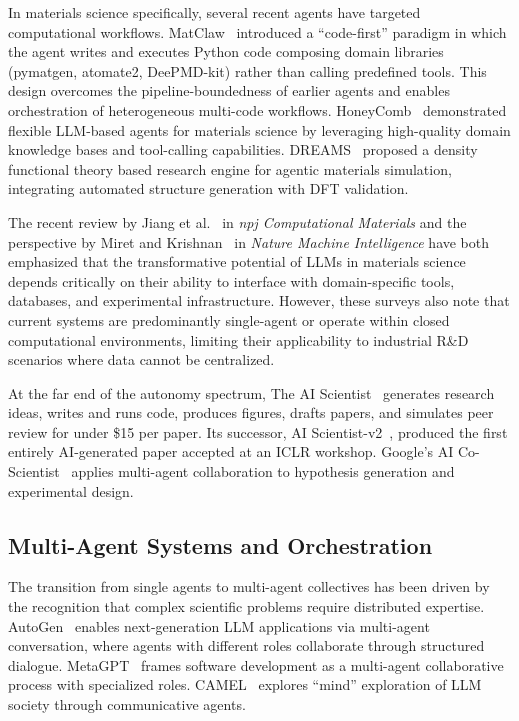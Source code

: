 \documentclass{article}
\begin{document}
In materials science specifically, several recent agents have targeted computational workflows. MatClaw~\cite{liu2024matclaw} introduced a ``code-first'' paradigm in which the agent writes and executes Python code composing domain libraries (pymatgen, atomate2, DeePMD-kit) rather than calling predefined tools. This design overcomes the pipeline-boundedness of earlier agents and enables orchestration of heterogeneous multi-code workflows. HoneyComb~\cite{zhang2024honeycomb} demonstrated flexible LLM-based agents for materials science by leveraging high-quality domain knowledge bases and tool-calling capabilities. DREAMS~\cite{wang2025dreams} proposed a density functional theory based research engine for agentic materials simulation, integrating automated structure generation with DFT validation.

The recent review by Jiang et al.~\cite{jiang2025npj} in \textit{npj Computational Materials} and the perspective by Miret and Krishnan~\cite{miret2025nmi} in \textit{Nature Machine Intelligence} have both emphasized that the transformative potential of LLMs in materials science depends critically on their ability to interface with domain-specific tools, databases, and experimental infrastructure. However, these surveys also note that current systems are predominantly single-agent or operate within closed computational environments, limiting their applicability to industrial R\&D scenarios where data cannot be centralized.

At the far end of the autonomy spectrum, The AI Scientist~\cite{lu2024} generates research ideas, writes and runs code, produces figures, drafts papers, and simulates peer review for under \$15 per paper. Its successor, AI Scientist-v2~\cite{yamada2025}, produced the first entirely AI-generated paper accepted at an ICLR workshop. Google's AI Co-Scientist~\cite{gottweis2025} applies multi-agent collaboration to hypothesis generation and experimental design.

\subsection{Multi-Agent Systems and Orchestration}

The transition from single agents to multi-agent collectives has been driven by the recognition that complex scientific problems require distributed expertise. AutoGen~\cite{wu2023autogen} enables next-generation LLM applications via multi-agent conversation, where agents with different roles collaborate through structured dialogue. MetaGPT~\cite{hong2024} frames software development as a multi-agent collaborative process with specialized roles. CAMEL~\cite{li2023camel} explores ``mind'' exploration of LLM society through communicative agents.
\end{document}
